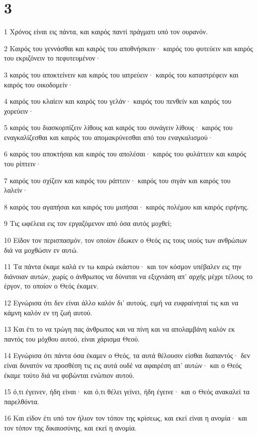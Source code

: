 \chapter{3}

\par 1 Χρόνος είναι εις πάντα, και καιρός παντί πράγματι υπό τον ουρανόν.
\par 2 Καιρός του γεννάσθαι και καιρός του αποθνήσκειν· καιρός του φυτεύειν και καιρός του εκριζόνειν το πεφυτευμένον·
\par 3 καιρός του αποκτείνειν και καιρός του ιατρεύειν· καιρός του καταστρέφειν και καιρός του οικοδομείν·
\par 4 καιρός του κλαίειν και καιρός του γελάν· καιρός του πενθείν και καιρός του χορεύειν·
\par 5 καιρός του διασκορπίζειν λίθους και καιρός του συνάγειν λίθους· καιρός του εναγκαλίζεσθαι και καιρός του απομακρύνεσθαι από του εναγκαλισμού·
\par 6 καιρός του αποκτήσαι και καιρός του απολέσαι· καιρός του φυλάττειν και καιρός του ρίπτειν·
\par 7 καιρός του σχίζειν και καιρός του ράπτειν· καιρός του σιγάν και καιρός του λαλείν·
\par 8 καιρός του αγαπήσαι και καιρός του μισήσαι· καιρός πολέμου και καιρός ειρήνης.
\par 9 Τις ωφέλεια εις τον εργαζόμενον από όσα αυτός μοχθεί;
\par 10 Είδον τον περισπασμόν, τον οποίον έδωκεν ο Θεός εις τους υιούς των ανθρώπων διά να μοχθώσιν εν αυτώ.
\par 11 Τα πάντα έκαμε καλά εν τω καιρώ εκάστου· και τον κόσμον υπέβαλεν εις την διάνοιαν αυτών, χωρίς ο άνθρωπος να δύναται να εξιχνιάση απ' αρχής μέχρι τέλους το έργον, το οποίον ο Θεός έκαμεν.
\par 12 Εγνώρισα ότι δεν είναι άλλο καλόν δι' αυτούς, ειμή να ευφραίνηταί τις και να κάμνη καλόν εν τη ζωή αυτού.
\par 13 Και έτι το να τρώγη πας άνθρωπος και να πίνη και να απολαμβάνη καλόν εκ παντός του μόχθου αυτού, είναι χάρισμα Θεού.
\par 14 Εγνώρισα ότι πάντα όσα έκαμεν ο Θεός, τα αυτά θέλουσιν είσθαι διαπαντός· δεν είναι δυνατόν να προσθέση τις εις αυτά ουδέ να αφαιρέση απ' αυτών· και ο Θεός έκαμε τούτο διά να φοβώνται ενώπιον αυτού.
\par 15 ό,τι έγεινεν, ήδη είναι· και ό,τι θέλει γείνει, ήδη έγεινε· και ο Θεός ανακαλεί τα παρελθόντα.
\par 16 Και είδον έτι υπό τον ήλιον τον τόπον της κρίσεως, και εκεί είναι η ανομία· και τον τόπον της δικαιοσύνης, και εκεί η ανομία.
